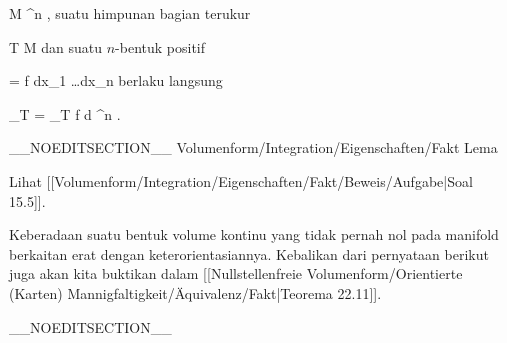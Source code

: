 \mavergleichskette
{\vergleichskette
{ M
}
{ \subseteq }{ \R^n
}
{  }{
}
{    }{
}
{   }{
}
}
{}{}{,}
suatu himpunan bagian terukur

\mavergleichskette
{\vergleichskette
{ T
}
{ \subseteq }{ M
}
{  }{
}
{    }{
}
{   }{
}
}
{}{}{}
dan suatu $n$-bentuk positif

\mavergleichskette
{\vergleichskette
{ \omega
}
{ = }{ f dx_1 \wedge \ldots \wedge dx_n
}
{  }{
}
{    }{
}
{   }{
}
}
{}{}{}
berlaku langsung

\mavergleichskettedisp
{\vergleichskette
{ \int_T \omega
}
{ =} { \int_T f d \lambda^n
}
{ } {
}
{ } {
}
{ } {
}
}
{}{}{.}

__NOEDITSECTION__
{Volumenform/Integration/Eigenschaften/Fakt}
{Lema}
{}
{

\faktzusatz {}
\faktzusatz {}

 }
{ Lihat [[Volumenform/Integration/Eigenschaften/Fakt/Beweis/Aufgabe|Soal 15.5]]. }


Keberadaan suatu bentuk volume kontinu yang tidak pernah nol pada manifold berkaitan erat dengan keterorientasiannya. Kebalikan dari pernyataan berikut juga akan kita buktikan dalam
[[Nullstellenfreie Volumenform/Orientierte (Karten) Mannigfaltigkeit/Äquivalenz/Fakt|Teorema 22.11]].

__NOEDITSECTION__

